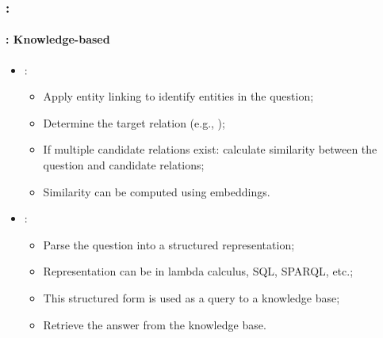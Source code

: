 \documentclass[xcolor=table]{beamer}
\begin{document}
\begin{frame}
	\frametitle{\insertshortsubtitle: \insertsection}
	\framesubtitle{\insertsubsection: Knowledge-based}
	
	\begin{itemize}
		\item {}:
		\begin{itemize}
			\item Apply entity linking to identify entities in the question;
			\item Determine the target relation (e.g., );
			\item If multiple candidate relations exist: calculate similarity between the question and candidate relations;
			\item Similarity can be computed using embeddings.
		\end{itemize}
		\item {}:
		\begin{itemize}
			\item Parse the question into a structured representation;
			\item Representation can be in lambda calculus, SQL, SPARQL, etc.;
			\item This structured form is used as a query to a knowledge base;
			\item Retrieve the answer from the knowledge base.
		\end{itemize}
	\end{itemize}
	
\end{frame}
\end{document}
